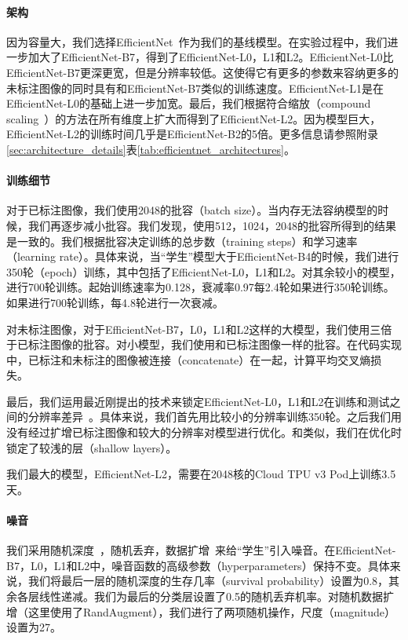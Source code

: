 \documentclass[10pt]{article}
\begin{document}
\paragraph{架构}
因为容量大，我们选择EfficientNet~\cite{tan2019efficientnet}作为我们的基线模型。在实验过程中，我们进一步加大了EfficientNet-B7，得到了EfficientNet-L0，L1和L2。EfficientNet-L0比EfficientNet-B7更深更宽，但是分辨率较低。这使得它有更多的参数来容纳更多的未标注图像的同时具有和EfficientNet-B7类似的训练速度。EfficientNet-L1是在EfficientNet-L0的基础上进一步加宽。最后，我们根据符合缩放（compound scaling~\cite{tan2019efficientnet}）的方法在所有维度上扩大而得到了EfficientNet-L2。因为模型巨大，EfficientNet-L2的训练时间几乎是EfficientNet-B2的5倍。更多信息请参照附录\ref{sec:architecture_details}表\ref{tab:efficientnet_architectures}。  

\paragraph{训练细节}
对于已标注图像，我们使用2048的批容（batch size）。当内存无法容纳模型的时候，我们再逐步减小批容。我们发现，使用512，1024，2048的批容所得到的结果是一致的。我们根据批容决定训练的总步数（training steps）和学习速率（learning rate）。具体来说，当“学生”模型大于EfficientNet-B4的时候，我们进行350轮（epoch）训练，其中包括了EfficientNet-L0，L1和L2。对其余较小的模型，进行700轮训练。起始训练速率为0.128，衰减率0.97每2.4轮如果进行350轮训练。如果进行700轮训练，每4.8轮进行一次衰减。  


对未标注图像，对于EfficientNet-B7，L0，L1和L2这样的大模型，我们使用三倍于已标注图像的批容。对小模型，我们使用和已标注图像一样的批容。在代码实现中，已标注和未标注的图像被连接（concatenate）在一起，计算平均交叉熵损失。


最后，我们运用最近刚提出的技术来锁定EfficientNet-L0，L1和L2在训练和测试之间的分辨率差异~\cite{touvron2019fixing}。具体来说，我们首先用比较小的分辨率训练350轮。之后我们用没有经过扩增已标注图像和较大的分辨率对模型进行优化。和\cite{touvron2019fixing}类似，我们在优化时锁定了较浅的层（shallow layers）。  


我们最大的模型，EfficientNet-L2，需要在2048核的Cloud TPU v3 Pod上训练3.5天。

\paragraph{噪音}
我们采用随机深度~\cite{huang2016deep}，随机丢弃\cite{srivastava2014dropout}，数据扩增~\cite{cubuk2019RandAugment}来给“学生”引入噪音。在EfficientNet-B7，L0，L1和L2中，噪音函数的高级参数（hyperparameters）保持不变。具体来说，我们将最后一层的随机深度的生存几率（survival probability）设置为0.8，其余各层线性递减。我们为最后的分类层设置了0.5的随机丢弃机率。对随机数据扩增（这里使用了RandAugment），我们进行了两项随机操作，尺度（magnitude）设置为27。
\end{document}
